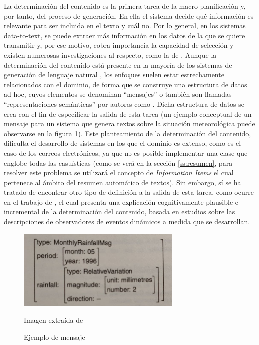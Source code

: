 La determinación del contenido es la primera tarea de la macro planificación y, por tanto, del proceso de generación. En ella el sistema decide qué información es relevante para ser incluida en el texto y cuál no. Por lo general, en los sistemas data-to-text, se puede extraer más información en los datos de la que se quiere transmitir y, por ese motivo, cobra importancia la capacidad de selección y existen numerosas investigaciones al respecto, como la de \cite{yu2007choosing}. Aunque la determinación del contenido está presente en la mayoría de los sistemas de generación de lenguaje natural \citep{mellish2006reference}, los enfoques suelen estar estrechamente relacionados con el dominio, de forma que se construye una estructura de datos ad hoc, cuyos elementos se denominan ``mensajes'' o también son llamadas ``representaciones semánticas'' por autores como \cite{duvsek2020evaluating}. Dicha estructura de datos se crea con el fin de especificar la salida de esta tarea (un ejemplo conceptual de un mensaje para un sistema que genera textos sobre la situación meteorológica puede observarse en la figura \ref{fig:messagenlg}). Este planteamiento de la determinación del contenido, dificulta el desarrollo de sistemas en los que el dominio es extenso, como es el caso de los correos electrónicos, ya que no es posible implementar una clase que englobe todas las casuísticas (como se verá en la sección \ref{ss:resumen}, para resolver este problema se utilizará el concepto de \textit{Information Items} el cual pertenece al ámbito del resumen automático de textos). Sin embargo, sí se ha tratado de encontrar otro tipo de definición a la salida de esta tarea, como ocurre en el trabajo de \cite{guhe2007incremental}, el cual presenta una explicación cognitivamente plausible e incremental de la determinación del contenido, basada en estudios sobre las descripciones de observadores de eventos dinámicos a medida que se desarrollan.

\begin{figure}[h]
	\centering%
	\centerline{\includegraphics[width = 0.7\textwidth]{Imagenes/Bitmap/message-nlg.jpg}}%
	\caption{Ejemplo de mensaje}%
	Imagen extraída de \cite{biblia}
	\label{fig:messagenlg}
\end{figure}

